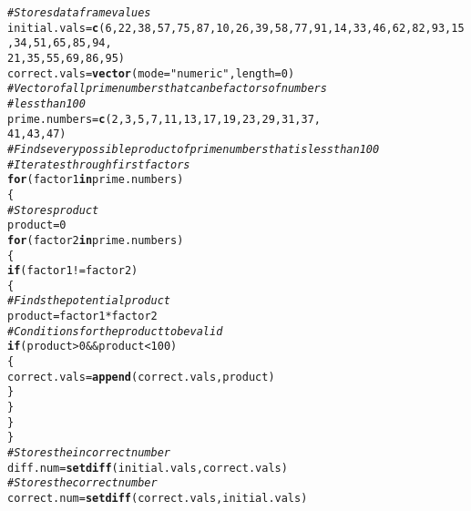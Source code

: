 \documentclass{article}\usepackage[]{graphicx}\usepackage[]{xcolor}
\makeatletter
\newcommand{\hlnum}[1]{\textcolor[rgb]{0.686,0.059,0.569}{#1}}%
\newcommand{\hlsng}[1]{\textcolor[rgb]{0.192,0.494,0.8}{#1}}%
\newcommand{\hlcom}[1]{\textcolor[rgb]{0.678,0.584,0.686}{\textit{#1}}}%
\newcommand{\hlopt}[1]{\textcolor[rgb]{0,0,0}{#1}}%
\newcommand{\hldef}[1]{\textcolor[rgb]{0.345,0.345,0.345}{#1}}%
\newcommand{\hlkwa}[1]{\textcolor[rgb]{0.161,0.373,0.58}{\textbf{#1}}}%
\newcommand{\hlkwb}[1]{\textcolor[rgb]{0.69,0.353,0.396}{#1}}%
\newcommand{\hlkwc}[1]{\textcolor[rgb]{0.333,0.667,0.333}{#1}}%
\newcommand{\hlkwd}[1]{\textcolor[rgb]{0.737,0.353,0.396}{\textbf{#1}}}%
\newenvironment{kframe}{%
 \def\at@end@of@kframe{}%
 \ifinner\ifhmode%
  \def\at@end@of@kframe{\end{minipage}}%
  \begin{minipage}{\columnwidth}%
 \fi\fi%
 \def\FrameCommand##1{\hskip\@totalleftmargin \hskip-\fboxsep
 \colorbox{shadecolor}{##1}\hskip-\fboxsep
     \hskip-\linewidth \hskip-\@totalleftmargin \hskip\columnwidth}%
 \MakeFramed {\advance\hsize-\width
   \@totalleftmargin\z@ \linewidth\hsize
   \@setminipage}}%
 {\par\unskip\endMakeFramed%
 \at@end@of@kframe}
\newenvironment{knitrout}{}{} %
\makeatother
\begin{document}
\begin{enumerate}
\begin{knitrout}\scriptsize
{}\color{fgcolor}\begin{kframe}
\begin{alltt}
\hlcom{#Stores data frame values}
\hldef{initial.vals} \hlkwb{=} \hlkwd{c}\hldef{(}\hlnum{6}\hldef{,} \hlnum{22}\hldef{,} \hlnum{38}\hldef{,} \hlnum{57}\hldef{,} \hlnum{75}\hldef{,} \hlnum{87}\hldef{,} \hlnum{10}\hldef{,} \hlnum{26}\hldef{,} \hlnum{39}\hldef{,} \hlnum{58}\hldef{,} \hlnum{77}\hldef{,} \hlnum{91}\hldef{,} \hlnum{14}\hldef{,} \hlnum{33}\hldef{,} \hlnum{46}\hldef{,} \hlnum{62}\hldef{,} \hlnum{82}\hldef{,} \hlnum{93}\hldef{,} \hlnum{15}\hldef{,} \hlnum{34}\hldef{,} \hlnum{51}\hldef{,} \hlnum{65}\hldef{,} \hlnum{85}\hldef{,} \hlnum{94}\hldef{,}
                  \hlnum{21}\hldef{,} \hlnum{35}\hldef{,} \hlnum{55}\hldef{,} \hlnum{69}\hldef{,} \hlnum{86}\hldef{,} \hlnum{95}\hldef{)}
\hldef{correct.vals} \hlkwb{=} \hlkwd{vector}\hldef{(}\hlkwc{mode} \hldef{=} \hlsng{"numeric"}\hldef{,} \hlkwc{length} \hldef{=} \hlnum{0}\hldef{)}
\hlcom{#Vector of all prime numbers that can be factors of numbers}
\hlcom{#less than 100}
\hldef{prime.numbers} \hlkwb{=} \hlkwd{c}\hldef{(}\hlnum{2}\hldef{,} \hlnum{3}\hldef{,} \hlnum{5}\hldef{,} \hlnum{7}\hldef{,} \hlnum{11}\hldef{,} \hlnum{13}\hldef{,} \hlnum{17}\hldef{,} \hlnum{19}\hldef{,} \hlnum{23}\hldef{,} \hlnum{29}\hldef{,} \hlnum{31}\hldef{,} \hlnum{37}\hldef{,}
\hlnum{41}\hldef{,} \hlnum{43}\hldef{,} \hlnum{47}\hldef{)}
\hlcom{#Finds every possible product of prime numbers that is less than 100}
\hlcom{#Iterates through first factors}
\hlkwa{for}\hldef{(factor1} \hlkwa{in} \hldef{prime.numbers)}
\hldef{\{}
  \hlcom{#Stores product }
  \hldef{product} \hlkwb{=} \hlnum{0}
  \hlkwa{for}\hldef{(factor2} \hlkwa{in} \hldef{prime.numbers)}
  \hldef{\{}
    \hlkwa{if}\hldef{(factor1} \hlopt{!=} \hldef{factor2)}
    \hldef{\{}
      \hlcom{#Finds the potential product}
      \hldef{product} \hlkwb{=} \hldef{factor1}\hlopt{*}\hldef{factor2}
      \hlcom{#Conditions for the product to be valid}
      \hlkwa{if}\hldef{(product}\hlopt{>} \hlnum{0} \hlopt{&&} \hldef{product} \hlopt{<} \hlnum{100}\hldef{)}
      \hldef{\{}
        \hldef{correct.vals} \hlkwb{=} \hlkwd{append}\hldef{(correct.vals, product)}
      \hldef{\}}
    \hldef{\}}
  \hldef{\}}
\hldef{\}}
\hlcom{#Stores the incorrect number}
\hldef{diff.num} \hlkwb{=} \hlkwd{setdiff}\hldef{(initial.vals, correct.vals)}
\hlcom{#Stores the correct number}
\hldef{correct.num} \hlkwb{=} \hlkwd{setdiff}\hldef{(correct.vals, initial.vals)}

\end{alltt}
\end{kframe}
\end{knitrout}
\end{enumerate}
\end{document}
